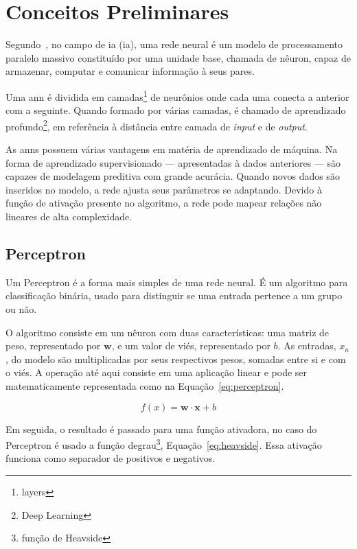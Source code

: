 \clearpage

\section{Conceitos Preliminares}

Segundo~\cite{haykin2009}, no campo de \acrlong{ia} (\acrshort{ia}), uma rede neural é um modelo de
processamento paralelo massivo constituído por uma unidade base, chamada de
nêuron, capaz de armazenar, computar e comunicar informação à seus pares.

Uma \acrshort{ann} é dividida em camadas\footnote{layers} de neurônios onde cada uma conecta a
anterior com a seguinte. Quando formado por várias camadas, é chamado de
aprendizado profundo\footnote{Deep Learning}, em referência à distância entre
camada de \emph{input} e de \emph{output}.

As \acrshort{ann}s possuem várias vantagens em matéria de aprendizado de máquina.
Na forma de aprendizado supervisionado --- apresentadas à dados anteriores ---
são capazes de modelagem preditiva com grande acurácia.  Quando novos dados são
inseridos no modelo, a rede ajusta seus parâmetros se adaptando.
Devido à função de ativação presente no algoritmo, a rede pode mapear relações
não lineares de alta complexidade.

\subsection{Perceptron}

Um Perceptron é a forma mais simples de uma rede neural. É um algoritmo
para classificação binária, usado para distinguir se uma
entrada pertence a um grupo ou não.

O algoritmo consiste em um nêuron com duas características: uma matriz de peso,
representado por $\mathbf{w}$, e um valor de viés, representado por $b$. As
entradas, $x_n$, do modelo são multiplicadas por seus respectivos pesos, somadas entre
si e com o viés. A operação até aqui consiste em uma aplicação linear e pode ser
matematicamente representada como na Equação~\ref{eq:perceptron}.

\begin{equation}
	f(x) = \mathbf{w} \cdot \mathbf{x} + b
	\label{eq:perceptron}
\end{equation}

Em seguida, o resultado é passado para uma função ativadora, no caso do
Perceptron é usado a função degrau\footnote{função de Heavside},
Equação~\ref{eq:heavside}. Essa ativação funciona como separador de positivos e
negativos.

